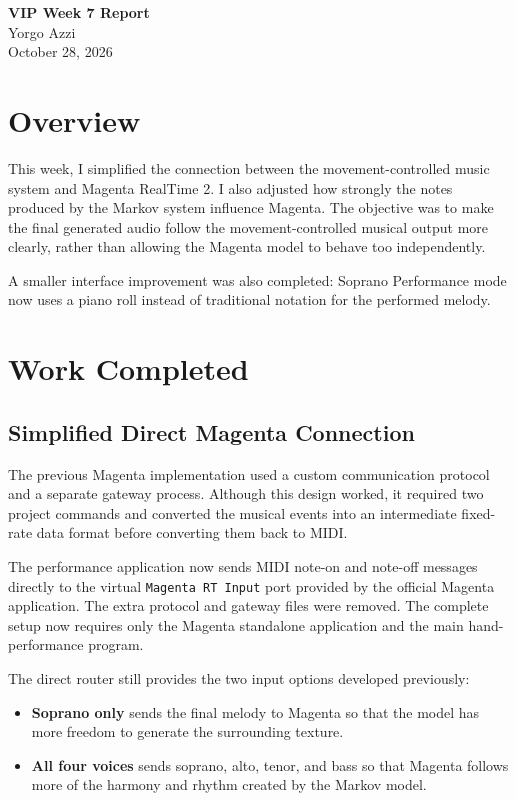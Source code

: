 \documentclass[11pt,a4paper]{article}
\begin{document}
\begin{center}
    {\Large\bfseries VIP Week 7 Report}\\[0.5em]
    {\large Yorgo Azzi}\\[0.25em]
    October 28, 2026
\end{center}

\section{Overview}

This week, I simplified the connection between the movement-controlled music
system and Magenta RealTime 2. I also adjusted how strongly the notes produced
by the Markov system influence Magenta. The objective was to make the final
generated audio follow the movement-controlled musical output more clearly,
rather than allowing the Magenta model to behave too independently.

A smaller interface improvement was also completed: Soprano Performance mode
now uses a piano roll instead of traditional notation for the performed melody.

\section{Work Completed}

\subsection{Simplified Direct Magenta Connection}

The previous Magenta implementation used a custom communication protocol and
a separate gateway process. Although this design worked, it required two
project commands and converted the musical events into an intermediate
fixed-rate data format before converting them back to MIDI.

The performance application now sends MIDI note-on and note-off messages
directly to the virtual \texttt{Magenta RT Input} port provided by the official
Magenta application. The extra protocol and gateway files were removed. The
complete setup now requires only the Magenta standalone application and the
main hand-performance program.

The direct router still provides the two input options developed previously:

\begin{itemize}
    \item \textbf{Soprano only} sends the final melody to Magenta so that the
    model has more freedom to generate the surrounding texture.
    \item \textbf{All four voices} sends soprano, alto, tenor, and bass so that
    Magenta follows more of the harmony and rhythm created by the Markov model.
\end{itemize}
\end{document}
